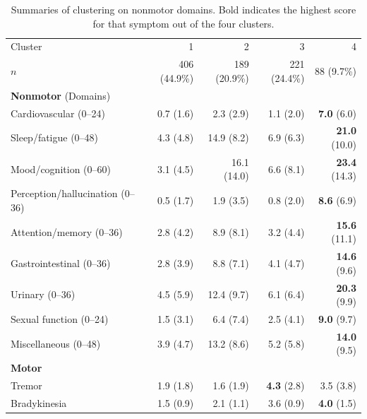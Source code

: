 \documentclass[preprint,3p,twocolumn]{elsarticle} %
\begin{document}
\begin{table}[t]
  \centering
  \caption{Summaries of clustering on nonmotor domains. Bold indicates the highest score for that
  symptom out of the four clusters.}
  \label{tab:nmd}
  \begin{threeparttable}
  \begin{tabular}{l r r r r}
    \toprule
    Cluster & 1 & 2 & 3 & 4 \\
    $n$ & 406 (44.9\%) & 189 (20.9\%) & 221 (24.4\%) & 88 (9.7\%) \\
    \midrule
    \textbf{Nonmotor} (Domains) & & & & \\
    Cardiovascular (0--24) & 0.7 (1.6)\tnote{24} & 2.3 (2.9)\tnote{134} & 1.1 (2.0)\tnote{24} &
    \textbf{7.0} (6.0)\tnote{234} \\
    Sleep/fatigue (0--48) & 4.3 (4.8)\tnote{234} & 14.9 (8.2)\tnote{134} & 6.9 (6.3)\tnote{124}
    & \textbf{21.0} (10.0)\tnote{123} \\
    Mood/cognition (0--60) & 3.1 (4.5)\tnote{234} & 16.1 (14.0)\tnote{134} & 6.6
    (8.1)\tnote{124} & \textbf{23.4} (14.3)\tnote{123} \\
    Perception/hallucination (0--36) & 0.5 (1.7)\tnote{24} & 1.9 (3.5)\tnote{134} & 0.8
    (2.0)\tnote{24} & \textbf{8.6} (6.9)\tnote{123} \\
    Attention/memory (0--36) & 2.8 (4.2)\tnote{24} & 8.9 (8.1)\tnote{134} & 3.2 (4.4)\tnote{24} &
    \textbf{15.6} (11.1)\tnote{123} \\
    Gastrointestinal (0--36) & 2.8 (3.9)\tnote{234} & 8.8 (7.1)\tnote{134} & 4.1
    (4.7)\tnote{124} & \textbf{14.6} (9.6)\tnote{123} \\
    Urinary (0--36) & 4.5 (5.9)\tnote{234} & 12.4 (9.7)\tnote{134} & 6.1 (6.4)\tnote{124} &
    \textbf{20.3} (9.9)\tnote{123} \\
    Sexual function (0--24) & 1.5 (3.1)\tnote{24} & 6.4 (7.4)\tnote{134} & 2.5 (4.1)\tnote{24} &
    \textbf{9.0} (9.7)\tnote{123} \\
    Miscellaneous (0--48) & 3.9 (4.7)\tnote{24} & 13.2 (8.6)\tnote{13} & 5.2 (5.8)\tnote{24} &
    \textbf{14.0} (9.5)\tnote{13} \\
    \midrule
    \textbf{Motor} & & & & \\
    Tremor & 1.9 (1.8)\tnote{34} & 1.6 (1.9)\tnote{34} & \textbf{4.3} (2.8)\tnote{124} & 3.5
    (3.8)\tnote{123} \\
    Bradykinesia & 1.5 (0.9)\tnote{234} & 2.1 (1.1)\tnote{134} & 3.6 (0.9)\tnote{124} &
    \textbf{4.0} (1.5)\tnote{123} \\

\end{tabular}
\end{threeparttable}
\end{table}
\end{document}
